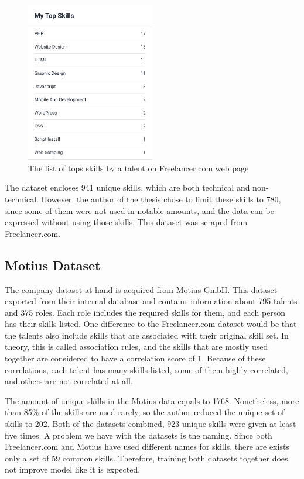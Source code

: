 \begin{figure}[htp]
	\centering
	\includegraphics[width=0.5\textwidth]{figures/FreelancerTalentSkills.png}
	\caption{The list of tops skills by a talent on Freelancer.com web page}
	\label{fig:freelancer-talent-talent}
\end{figure}


The dataset encloses  941 unique skills, which are both technical and non-technical. However, the author of the thesis chose to limit these skills to 780, since some of them were not used in notable amounts, and the data can be expressed without using those skills. This dataset was scraped from Freelancer.com.


\subsection{Motius Dataset}\label{subsection:company-dataset}

The company dataset at hand is acquired from Motius GmbH. This dataset exported from their internal database and contains information about 795 talents and 375 roles. Each role includes the required skills for them, and each person has their skills listed. One difference to the Freelancer.com dataset would be that the talents also include skills that are associated with their original skill set. In theory, this is called association rules, and the skills that are mostly used together are considered to have a correlation score of 1. Because of these correlations, each talent has many skills listed, some of them highly correlated, and others are not correlated at all.


The amount of unique skills in the Motius data equals to 1768. Nonetheless, more than 85\% of the skills are used rarely, so the author reduced the unique set of skills to  202. Both of the datasets combined, 923 unique skills were given at least five times. A problem we have with the datasets is the naming. Since both Freelancer.com and Motius have used different names for skills, there are exists only a set of 59 common skills. Therefore, training both datasets together does not improve model like it is expected.



